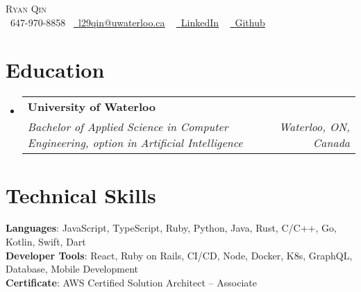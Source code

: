 \documentclass[letterpaper,11pt]{article}
\makeatletter
\newcommand{\resumeSubheading}[4]{
  \vspace{-2pt}\item
    \begin{tabular*}{1.0\textwidth}[t]{l@{\extracolsep{\fill}}r}
      \textbf{#1} & \textbf{\small #2} \\
      \textit{\small#3} & \textit{\small #4} \\
    \end{tabular*}\vspace{-7pt}
}
\newcommand{\resumeSubHeadingListStart}{\begin{itemize}[leftmargin=0.0in, label={}]}
\newcommand{\resumeSubHeadingListEnd}{\end{itemize}}
\makeatother
\begin{document}
\begin{center}
    {\Huge \scshape Ryan Qin} \\ \vspace{1pt}
    \small \raisebox{-0.1\height}\faPhone\ 647-970-8858~ \href{l29qin@uwaterloo.ca}{\raisebox{-0.2\height}\faEnvelope\  \underline{l29qin@uwaterloo.ca}} ~ 
    \href{https://www.linkedin.com/in/ryan-qin-4b8157130}{\raisebox{-0.2\height}\faLinkedin\ \underline{LinkedIn}}  ~
    \href{https://github.com/lang98}{\raisebox{-0.2\height}\faGithub\ \underline{Github}}
    \vspace{-8pt}
\end{center}


\section{Education}
  \resumeSubHeadingListStart
    \resumeSubheading
      {University of Waterloo}{}
      {Bachelor of Applied Science in Computer Engineering, option in Artificial Intelligence}{Waterloo, ON, Canada}
  \resumeSubHeadingListEnd

%
\section{Technical Skills}
  \begin{itemize}[leftmargin=0.15in, label={}]
    \small{\item{
      \textbf{Languages}{: JavaScript, TypeScript, Ruby, Python, Java, Rust, C/C++, Go, Kotlin, Swift, Dart} \\
      \textbf{Developer Tools}{: React, Ruby on Rails, CI/CD, Node, Docker, K8s, GraphQL, Database, Mobile Development} \\
      \textbf{Certificate}{: AWS Certified Solution Architect – Associate} \\
    }}
  \end{itemize}
\vspace{-16pt}
\end{document}
